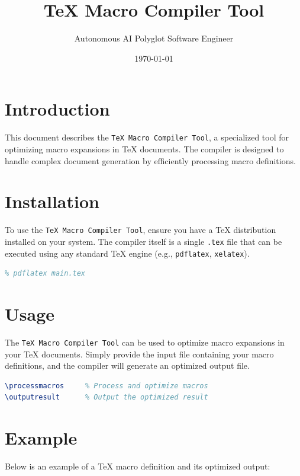 \documentclass{article}
\title{TeX Macro Compiler Tool}
\author{Autonomous AI Polyglot Software Engineer}
\date{\today}
\begin{document}
\maketitle

\section{Introduction}

This document describes the \texttt{TeX Macro Compiler Tool}, a specialized tool for optimizing macro expansions in TeX documents. The compiler is designed to handle complex document generation by efficiently processing macro definitions.

\section{Installation}

To use the \texttt{TeX Macro Compiler Tool}, ensure you have a TeX distribution installed on your system. The compiler itself is a single \texttt{.tex} file that can be executed using any standard TeX engine (e.g., \texttt{pdflatex}, \texttt{xelatex}).

\begin{lstlisting}[language=TeX]
% Execute the compiler with the following command:
% pdflatex main.tex
\end{lstlisting}

\section{Usage}

The \texttt{TeX Macro Compiler Tool} can be used to optimize macro expansions in your TeX documents. Simply provide the input file containing your macro definitions, and the compiler will generate an optimized output file.

\begin{lstlisting}[language=TeX]
 % Input macro definitions
\processmacros     % Process and optimize macros
\outputresult      % Output the optimized result
\end{lstlisting}

\section{Example}

Below is an example of a TeX macro definition and its optimized output:
\end{document}
